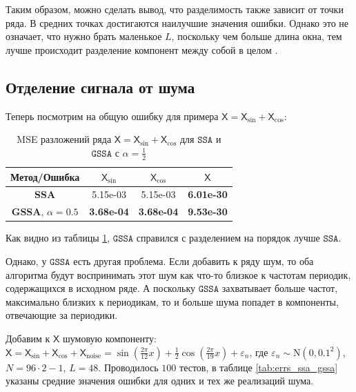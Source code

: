 \documentclass[12pt, specialist, subf
]{disser}
\theoremstyle{definition}
\newcommand{\SSA}{\texttt{SSA}}
\newcommand{\GSSA}{\texttt{GSSA}}
\newcommand{\TS}{\mathsf{X}}
\begin{document}
Таким образом, можно сделать вывод, что разделимость также зависит от точки ряда. В средних точках достигаются наилучшие значения ошибки. Однако это не означает, что нужно брать маленькое $L$, поскольку чем больше длина окна, тем лучше происходит разделение компонент между собой в целом \cite{golyandina2001analysis}.











\subsection{Отделение сигнала от шума}

Теперь посмотрим на общую ошибку для примера $\TS = \TS_{\sin} + \TS_{\cos}$:

\begin{table}[H]
	\caption{MSE разложений ряда $\TS = \TS_{\sin} + \TS_{\cos}$ для $\SSA$ и $\GSSA$ с $\alpha = \frac{1}{2}$}
	\centering
	\begin{tabular}{c|ccc}
		\hline
		Метод/Ошибка                  & $\TS_{\sin}$      & $\TS_{\cos}$      & $\TS$             \\
		\hline
		\textbf{SSA}                  & 5.15e-03          & 5.15e-03          & \textbf{6.01e-30} \\
		\textbf{GSSA}, $\alpha = 0.5$ & \textbf{3.68e-04} & \textbf{3.68e-04} & \textbf{9.53e-30} \\
		\hline
	\end{tabular}

	\label{tab:mse_ssa_gssa}
\end{table}

Как видно из таблицы \ref{tab:mse_ssa_gssa}, $\GSSA$ справился с разделением на порядок лучше $\SSA$.

Однако, у $\GSSA$ есть другая проблема. Если добавить к ряду шум, то оба алгоритма будут воспринимать этот шум как что-то близкое к частотам периодик, содержащихся в исходном ряде. А поскольку $\GSSA$ захватывает больше частот, максимально близких к периодикам, то и больше шума попадет в компоненты, отвечающие за периодики.

Добавим к $\TS$ шумовую компоненту: $\TS = \TS_{\sin} + \TS_{\cos} + \TS_{\mathrm{noise}} =
	\sin\left(\frac{2\pi}{12}x\right) +
	\frac{1}{2}\cos\left(\frac{2\pi}{19}x\right)+
	\varepsilon_n$,
где $\varepsilon_n \sim \mathrm N(0, 0.1^2)$, $N = 96 \cdot 2 - 1$, $L = 48$.
Проводилось $100$ тестов, в таблице \ref{tab:errs_ssa_gssa} указаны средние значения ошибки для одних и тех же реализаций шума.
\end{document}
